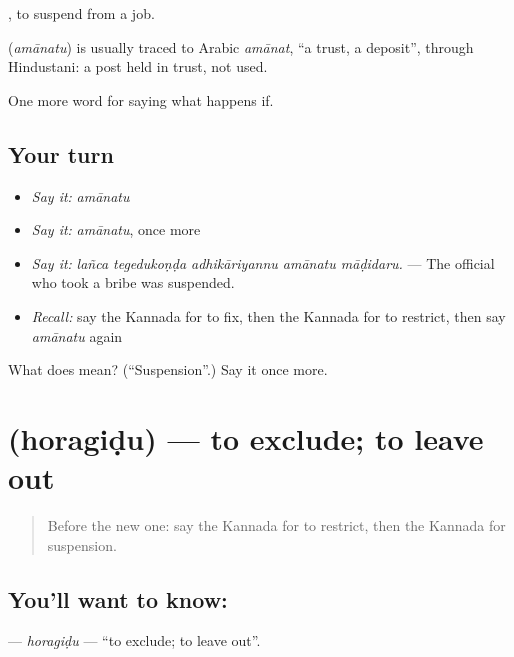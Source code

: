  , to suspend from a job.

\begin{cousinweb}
\textbf{} (\emph{amānatu}) is usually traced to Arabic \emph{amānat}, \textquotedblleft{}a trust, a deposit\textquotedblright{}, through Hindustani: a post held in trust, not used.
\end{cousinweb}

\begin{grammarlens}[title={What you've built}]
One more word for saying what happens if.
\end{grammarlens}

\subsection*{Your turn}
\begin{itemize}
\raggedright
  \item \emph{Say it:} \emph{amānatu}
  \item \emph{Say it:} \emph{amānatu}, once more
  \item \emph{Say it:} \emph{lañca tegedukoṇḍa adhikāriyannu amānatu māḍidaru.} — The official who took a bribe was suspended.
  \item \emph{Recall:} say the Kannada for to fix, then the Kannada for to restrict, then say \emph{amānatu} again
\end{itemize}

\begin{tcolorbox}[breakable,colback=teal!4,colframe=teal!35!black,title={Before you move on}]
What does  mean? (\textquotedblleft{}Suspension\textquotedblright{}.) Say it once more.
\end{tcolorbox}
\section[\texorpdfstring{\kn{ಹೊರಗಿಡು} (horagiḍu)}{ಹೊರಗಿಡು (horagiḍu)}]{ (horagiḍu) — to exclude; to leave out}

\label{lesson:KA-C415-horagidu}



\begin{quote}
Before the new one: say the Kannada for to restrict, then the Kannada for suspension.
\end{quote}

\subsection*{You'll want to know: }
\textbf{} — \emph{horagiḍu} — \textquotedblleft{}to exclude; to leave out\textquotedblright{}.

